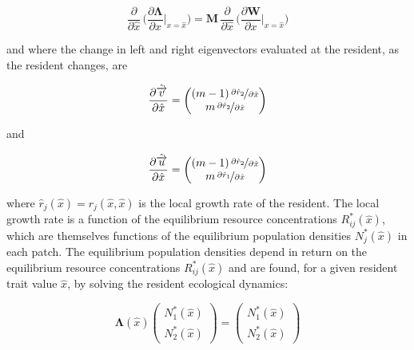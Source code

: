 \begin{equation}
    \frac{\partial}{\partial \hat x}\,\bigg(\frac{\partial \pmb \Lambda}{\partial x}\bigg|_{x=\hat x}\bigg) = \pmb M \, \frac{\partial}{\partial \hat x}\,\bigg(\frac{\partial \pmb W}{\partial x}\bigg|_{x=\hat x}\bigg)
\end{equation}

and where the change in left and right eigenvectors evaluated at the resident, as the resident changes, are

\begin{equation}
    \frac{\partial \hat{\overrightarrow{v}} }{\partial \hat x} = 
    \begin{pmatrix}
        (m-1)\,\nicefrac{\partial \hat r_2}{\partial \hat x}\\
        m\,\nicefrac{\partial \hat r_2}{\partial \hat x}
    \end{pmatrix}
    \label{eq:deriv_left_eigenvector_resident}
\end{equation}

and

\begin{equation}
    \frac{\partial \hat{\overrightarrow{u}} }{\partial \hat x} = 
    \begin{pmatrix}
        (m-1)\,\nicefrac{\partial \hat r_2}{\partial \hat x}\\
        m\,\nicefrac{\partial \hat r_1}{\partial \hat x}
    \end{pmatrix}
    \label{eq:deriv_right_eigenvector_resident}
\end{equation}

where $\hat r_j(\hat x) = r_j(\hat x, \hat x)$ is the local growth rate of the resident. The local growth rate is a function of the equilibrium resource concentrations $R^*_{ij}(\hat x)$, which are themselves functions of the equilibrium population densities $N^*_j(\hat x)$ in each patch. The equilibrium population densities depend in return on the equilibrium resource concentrations $R^*_{ij}(\hat x)$ and are found, for a given resident trait value $\hat x$, by solving the resident ecological dynamics:

\begin{equation}
    \pmb \Lambda(\hat x)
    \begin{pmatrix}
        N^*_1(\hat x)\\
        N^*_2(\hat x)
    \end{pmatrix}
    =
    \begin{pmatrix}
        N^*_1(\hat x)\\
        N^*_2(\hat x) 
    \end{pmatrix}
\end{equation}

